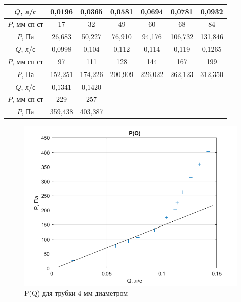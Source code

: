 \documentclass[a4paper, 12pt]{article} %
\begin{document}
\begin{table}[!h]
\begin{tabular}{|c|c|c|c|c|c|c|}
\hline
$Q$, л/с      & 0,0196   & 0,0365   & 0,0581                & 0,0694                & 0,0781               & 0,0932                \\ \hline
$P$, мм сп ст & 17       & 32       & 49                    & 60                    & 68                    & 84                    \\ \hline
$P$, Па       & 26,683  & 50,227  & 76,910               & 94,176   & 106,732              & 131,846              \\ \hline
$Q$, л/с      & 0,0998   & 0,104    & 0,112                 & 0,114                 & 0,119                 & 0,1265                \\ \hline
$P$, мм сп ст & 97       & 111      & 128                   & 144                   & 167                   & 199                   \\ \hline
$P$, Па       & 152,251 & 174,226 & 200,909              & 226,022 & 262,123              & 312,350              \\ \hline
$Q$, л/с      & 0,1341    & 0,1420    & \multicolumn{1}{l|}{} & \multicolumn{1}{l|}{} & \multicolumn{1}{l|}{} & \multicolumn{1}{l|}{} \\ \hline
$P$, мм сп ст & 229      & 257      & \multicolumn{1}{l|}{} & \multicolumn{1}{l|}{} & \multicolumn{1}{l|}{} & \multicolumn{1}{l|}{} \\ \hline
$P$, Па       & 359,438 & 403,387 & \multicolumn{1}{l|}{} & \multicolumn{1}{l|}{} & \multicolumn{1}{l|}{} & \multicolumn{1}{l|}{} \\ \hline
\end{tabular}
\end{table}

\begin{figure}[!h]
    \centering
    \includegraphics[width = 12 cm]{4mm}
    \caption{P(Q) для трубки 4 мм диаметром}
    \label{fig:vac}
\end{figure}
\end{document}
